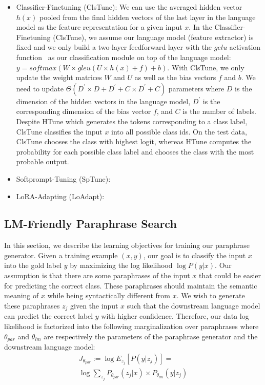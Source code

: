 \documentclass[11pt]{article}
\begin{document}
\begin{itemize}
    \item Classifier-Finetuning (ClsTune): We can use the averaged hidden vector $h(x)$ pooled from the final hidden vectors of the last layer in the language model as the feature representation for a given input $x$. In the Classifier-Finetuning (ClsTune), we assume our language model (feature extractor) is fixed and we only build a two-layer feedforward layer with the $gelu$ activation function~\cite{DBLP:journals/corr/HendrycksG16} as our classification module on top of the language model: $y = softmax(W \times gleu(U \times h(x) + f) + b)$. With ClsTune, we only update the weight matrices $W$ and $U$ as well as the bias vectors $f$ and $b$. We need to update $\Theta(D^{'} \times D + D^{'} + C \times D^{'} + C)$ parameters where $D$ is the dimension of the hidden vectors in the language model, $D^{'}$ is the corresponding dimension of the bias vector $f$, and $C$ is the number of labels. Despite HTune which generates the tokens corresponding to a class label, ClsTune classifies the input $x$ into all possible class ids. On the test data, ClsTune chooses the class with  highest logit, whereas HTune computes the probability for each possible class label and chooses the class with the most probable output.
    \item Softprompt-Tuning (SpTune): 
    \item LoRA-Adapting (LoAdapt):
\end{itemize}

\subsection{LM-Friendly Paraphrase Search}
In this section, we describe the learning objectives for training our paraphrase generator. Given a training example $(x, y)$, our goal is to classify the input $x$ into the gold label $y$ by maximizing the log likelihood $\log P(y|x)$. Our assumption is that there are some paraphrases of the input $x$ that could be easier for predicting the correct class. These paraphrases should maintain the semantic meaning of $x$ while being syntactically different from $x$. We wish to generate these paraphrases $z_{j}$ given the input $x$ such that the downstream language model can predict the correct label $y$ with higher confidence. Therefore, our data log likelihood is factorized into the following marginalization over paraphrases where $\theta_{par}$ and $\theta_{lm}$ are respectively the parameters of the paraphrase generator and the downstream language model:
\begin{multline}
J_{\theta_{par}} := \log E_{z_{j}} [P(y | z_{j})] = \\ \log \sum_{z_{j}} P_{\theta_{par}}(z_{j} | x) \times P_{\theta_{lm}}(y | z_{j})
\label{lmfp-main-objective}
\end{multline}
\end{document}
